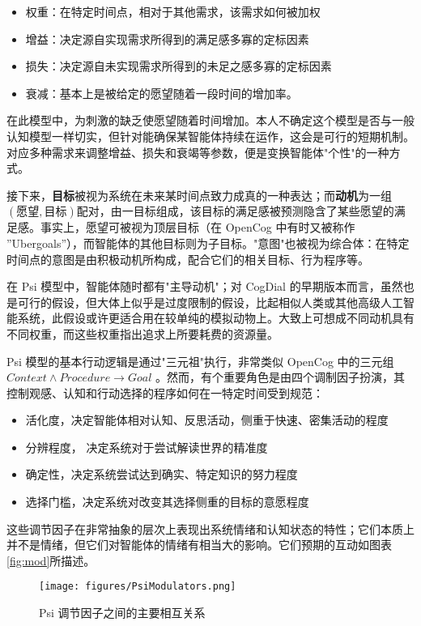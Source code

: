 \begin{itemize}
\item 权重：在特定时间点，相对于其他需求，该需求如何被加权
\item  增益：决定源自实现需求所得到的满足感多寡的定标因素
\item  损失：决定源自未实现需求所得到的未足之感多寡的定标因素
\item  衰减：基本上是被给定的愿望随着一段时间的增加率。

\end{itemize}

在此模型中，为刺激的缺乏使愿望随着时间增加。本人不确定这个模型是否与一般认知模型一样切实，但针对能确保某智能体持续在运作，这会是可行的短期机制。对应多种需求来调整增益、损失和衰竭等参数，便是变换智能体"个性"的一种方式。

接下来，{\bf 目标}被视为系统在未来某时间点致力成真的一种表达；而{\bf 动机}为一组 $(愿望, 目标)$配对，由一目标组成，该目标的满足感被预测隐含了某些愿望的满足感。事实上，愿望可被视为顶层目标（在 OpenCog 中有时又被称作 ”Ubergoals”），而智能体的其他目标则为子目标。"意图"也被视为综合体：在特定时间点的意图是由积极动机所构成，配合它们的相关目标、行为程序等。

在 Psi 模型中，智能体随时都有"主导动机"；对 CogDial 的早期版本而言，虽然也是可行的假设，但大体上似乎是过度限制的假设，比起相似人类或其他高级人工智能系统，此假设或许更适合用在较单纯的模拟动物上。大致上可想成不同动机具有不同权重，而这些权重指出追求上所要耗费的资源量。

Psi 模型的基本行动逻辑是通过"三元祖"执行，非常类似 OpenCog 中的三元组$\textit{Context} \land \textit{Procedure} \rightarrow \textit{Goal}$ 。然而，有个重要角色是由四个调制因子扮演，其控制观感、认知和行动选择的程序如何在一特定时间受到规范：

\begin{itemize}
\item  活化度，决定智能体相对认知、反思活动，侧重于快速、密集活动的程度 
\item 分辨程度， 决定系统对于尝试解读世界的精准度 
\item 确定性，决定系统尝试达到确实、特定知识的努力程度 
\item 选择门槛，决定系统对改变其选择侧重的目标的意愿程度
\end{itemize}

这些调节因子在非常抽象的层次上表现出系统情绪和认知状态的特性；它们本质上并不是情绪，但它们对智能体的情绪有相当大的影响。它们预期的互动如图表\ref{fig:mod}所描述。


\begin{figure}[htb]
\centering
\texttt{[image: figures/PsiModulators.png]}
\caption{Psi 调节因子之间的主要相互关系}
\label{fig:Mod}
\end{figure}

